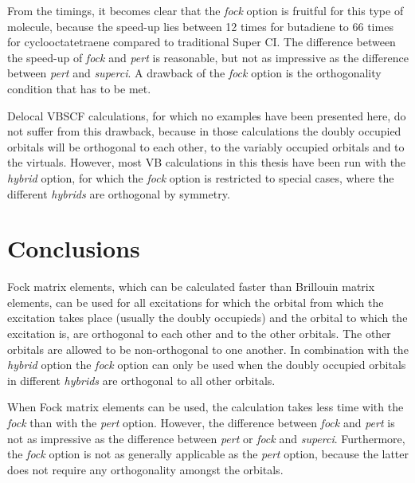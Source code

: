 From the timings, it becomes clear that the \textit{fock} option is fruitful for this type of molecule, because the speed-up lies between 12 times for butadiene to 66 times for cyclooctatetraene compared to traditional Super CI. The difference between the speed-up of \textit{fock} and \textit{pert} is reasonable, but not as impressive as the difference between \textit{pert} and \textit{superci}. A drawback of the \textit{fock} option is the orthogonality condition that has to be met. 

Delocal VBSCF calculations, for which no examples have been presented here, do not suffer from this drawback, because in those calculations the doubly occupied orbitals will be orthogonal to each other, to the variably occupied orbitals and to the virtuals. However, most VB calculations in this thesis have been run with the \textit{hybrid} option, for which the \textit{fock} option is restricted to special cases, where the different \textit{hybrids} are orthogonal by symmetry.


\section{Conclusions}

Fock matrix elements, which can be calculated faster than Brillouin matrix elements, can be used for all excitations for which the orbital from which the excitation takes place (usually the doubly occupieds) and the orbital to which the excitation is, are orthogonal to each other and to the other orbitals. The other orbitals are allowed to be non-orthogonal to one another. In combination with the \textit{hybrid} option the \textit{fock} option can only be used when the doubly occupied orbitals in different \textit{hybrids} are orthogonal to all other orbitals.

When Fock matrix elements can be used, the calculation takes less time with the \textit{fock} than with the \textit{pert} option. However, the difference between \textit{fock} and \textit{pert} is not as impressive as the difference between \textit{pert} or \textit{fock} and \textit{superci}. Furthermore, the \textit{fock} option is not as generally applicable as the \textit{pert} option, because the latter does not require any orthogonality amongst the orbitals.


